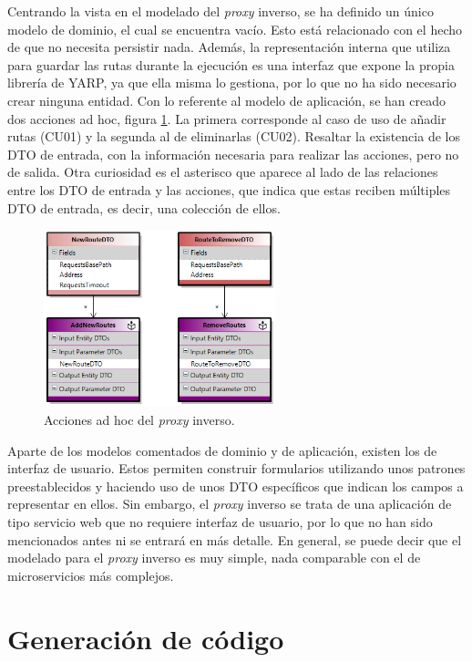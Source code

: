 \documentclass[11pt,spanish,listoffigures]{tfgetsinf}
\begin{document}
Centrando la vista en el modelado del \emph{proxy} inverso, se ha definido un único modelo de dominio, el cual se encuentra vacío. Esto está relacionado con el hecho de que no necesita persistir nada. Además, la representación interna que utiliza para guardar las rutas durante la ejecución es una interfaz que expone la propia librería de YARP, ya que ella misma lo gestiona, por lo que no ha sido necesario crear ninguna entidad. Con lo referente al modelo de aplicación, se han creado dos acciones ad hoc, figura \ref{accionesAdHoc}. La primera corresponde al caso de uso de añadir rutas (CU01) y la segunda al de eliminarlas (CU02). Resaltar la existencia de los DTO de entrada, con la información necesaria para realizar las acciones, pero no de salida. Otra curiosidad es el asterisco que aparece al lado de las relaciones entre los DTO de entrada y las acciones, que indica que estas reciben múltiples DTO de entrada, es decir, una colección de ellos.

\begin{figure}[ht]
\centering
\includegraphics[width=0.6\textwidth]{imagenes/apendice/accionesAdHoc}
\caption{Acciones ad hoc del \emph{proxy} inverso.}
	\label{accionesAdHoc}
\end{figure}

Aparte de los modelos comentados de dominio y de aplicación, existen los de interfaz de usuario. Estos permiten construir formularios utilizando unos patrones preestablecidos y haciendo uso de unos DTO específicos que indican los campos a representar en ellos. Sin embargo, el \emph{proxy} inverso se trata de una aplicación de tipo servicio web que no requiere interfaz de usuario, por lo que no han sido mencionados antes ni se entrará en más detalle. En general, se puede decir que el modelado para el \emph{proxy} inverso es muy simple, nada comparable con el de microservicios más complejos.

	\section{Generación de código}
\end{document}
